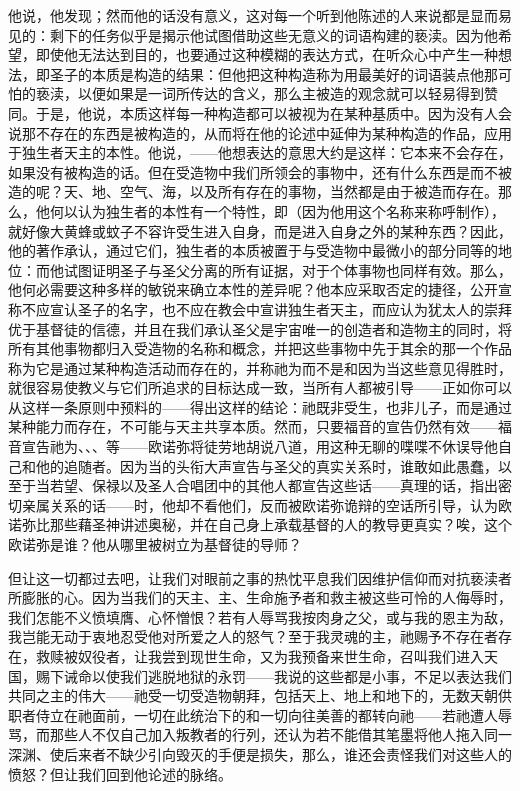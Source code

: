 他说，他发现；然而他的话没有意义，这对每一个听到他陈述的人来说都是显而易见的：剩下的任务似乎是揭示他试图借助这些无意义的词语构建的亵渎。因为他希望，即使他无法达到目的，也要通过这种模糊的表达方式，在听众心中产生一种想法，即圣子的本质是构造的结果：但他把这种构造称为用最美好的词语装点他那可怕的亵渎，以便如果是一词所传达的含义，那么主被造的观念就可以轻易得到赞同。于是，他说，本质这样每一种构造都可以被视为在某种基质中。因为没有人会说那不存在的东西是被构造的，从而将在他的论述中延伸为某种构造的作品，应用于独生者天主的本性。他说，——他想表达的意思大约是这样：它本来不会存在，如果没有被构造的话。但在受造物中我们所领会的事物中，还有什么东西是而不被造的呢？天、地、空气、海，以及所有存在的事物，当然都是由于被造而存在。那么，他何以认为独生者的本性有一个特性，即（因为他用这个名称来称呼制作），就好像大黄蜂或蚊子不容许受生进入自身，而是进入自身之外的某种东西？因此，他的著作承认，通过它们，独生者的本质被置于与受造物中最微小的部分同等的地位：而他试图证明圣子与圣父分离的所有证据，对于个体事物也同样有效。那么，他何必需要这种多样的敏锐来确立本性的差异呢？他本应采取否定的捷径，公开宣称不应宣认圣子的名字，也不应在教会中宣讲独生者天主，而应认为犹太人的崇拜优于基督徒的信德，并且在我们承认圣父是宇宙唯一的创造者和造物主的同时，将所有其他事物都归入受造物的名称和概念，并把这些事物中先于其余的那一个作品称为它是通过某种构造活动而存在的，并称祂为而不是和因为当这些意见得胜时，就很容易使教义与它们所追求的目标达成一致，当所有人都被引导——正如你可以从这样一条原则中预料的——得出这样的结论：祂既非受生，也非儿子，而是通过某种能力而存在，不可能与天主共享本质。然而，只要福音的宣告仍然有效——福音宣告祂为、、、等——欧诺弥将徒劳地胡说八道，用这种无聊的喋喋不休误导他自己和他的追随者。因为当的头衔大声宣告与圣父的真实关系时，谁敢如此愚蠢，以至于当若望、保禄以及圣人合唱团中的其他人都宣告这些话——真理的话，指出密切亲属关系的话——时，他却不看他们，反而被欧诺弥诡辩的空话所引导，认为欧诺弥比那些藉圣神讲述奥秘，并在自己身上承载基督的人的教导更真实？唉，这个欧诺弥是谁？他从哪里被树立为基督徒的导师？\par

但让这一切都过去吧，让我们对眼前之事的热忱平息我们因维护信仰而对抗亵渎者所膨胀的心。因为当我们的天主、主、生命施予者和救主被这些可怜的人侮辱时，我们怎能不义愤填膺、心怀憎恨？若有人辱骂我按肉身之父，或与我的恩主为敌，我岂能无动于衷地忍受他对所爱之人的怒气？至于我灵魂的主，祂赐予不存在者存在，救赎被奴役者，让我尝到现世生命，又为我预备来世生命，召叫我们进入天国，赐下诫命以使我们逃脱地狱的永罚——我说的这些都是小事，不足以表达我们共同之主的伟大——祂受一切受造物朝拜，包括天上、地上和地下的，无数天朝供职者侍立在祂面前，一切在此统治下的和一切向往美善的都转向祂——若祂遭人辱骂，而那些人不仅自己加入叛教者的行列，还认为若不能借其笔墨将他人拖入同一深渊、使后来者不缺少引向毁灭的手便是损失，那么，谁还会责怪我们对这些人的愤怒？但让我们回到他论述的脉络。\par

